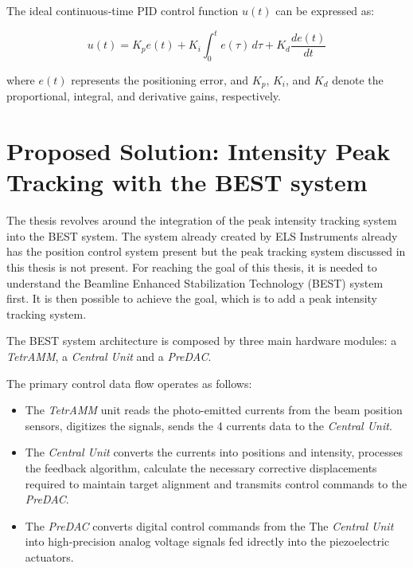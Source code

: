 The ideal continuous-time PID control function $u(t)$ can be expressed as:

\begin{equation}
    u(t) = K_p e(t) + K_i \int_{0}^{t} e(\tau) \, d\tau + K_d \frac{de(t)}{dt} 
\end{equation}

where $e(t)$ represents the positioning error, and $K_p$, $K_i$, and $K_d$ denote the proportional, integral, and derivative gains, respectively.

\section{Proposed Solution: Intensity Peak Tracking with the BEST system}


The thesis revolves around the integration of the peak intensity tracking system into the BEST system.
The system already created by ELS Instruments already has the position control system present but the peak tracking system discussed in this thesis is not present.
For reaching the goal of this thesis, it is needed to understand the Beamline Enhanced
Stabilization Technology (BEST) system first. 
It is then possible to achieve the goal, which is to add a peak intensity tracking system.

The BEST system architecture is composed by three main hardware modules: a \textit{TetrAMM}, a \textit{Central Unit} and a \textit{PreDAC}.

The primary control data flow operates as follows:
\begin{itemize}
    \item The \textit{TetrAMM} unit reads the photo-emitted currents from the beam position sensors, digitizes the signals, sends the 4 currents data to the \textit{Central Unit}.
    \item The \textit{Central Unit} converts the currents into positions and intensity, processes the feedback algorithm, calculate the necessary corrective displacements required to maintain target alignment and transmits control commands to the \textit{PreDAC}.
    \item The \textit{PreDAC} converts digital control commands from the The \textit{Central Unit} into high-precision analog voltage signals fed idrectly into the piezoelectric actuators.

\end{itemize}



